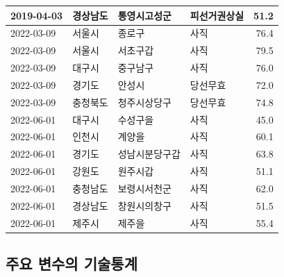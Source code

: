 \documentclass[
  11pt,
  letter]{article}
\begin{document}
\begin{longtable}[t]{l|l|l|l|r}
\hline
2019-04-03 & 경상남도 & 통영시고성군 & 피선거권상실 & 51.2\\
\hline
2022-03-09 & 서울시 & 종로구 & 사직 & 76.4\\
\hline
2022-03-09 & 서울시 & 서초구갑 & 사직 & 79.5\\
\hline
2022-03-09 & 대구시 & 중구남구 & 사직 & 76.0\\
\hline
2022-03-09 & 경기도 & 안성시 & 당선무효 & 72.0\\
\hline
2022-03-09 & 충청북도 & 청주시상당구 & 당선무효 & 74.8\\
\hline
2022-06-01 & 대구시 & 수성구을 & 사직 & 45.0\\
\hline
2022-06-01 & 인천시 & 계양을 & 사직 & 60.1\\
\hline
2022-06-01 & 경기도 & 성남시분당구갑 & 사직 & 63.8\\
\hline
2022-06-01 & 강원도 & 원주시갑 & 사직 & 51.1\\
\hline
2022-06-01 & 충청남도 & 보령시서천군 & 사직 & 62.0\\
\hline
2022-06-01 & 경상남도 & 창원시의창구 & 사직 & 51.5\\
\hline
2022-06-01 & 제주시 & 제주을 & 사직 & 55.4\\
\hline
\end{longtable}

\newpage

\hypertarget{uxc8fcuxc694-uxbcc0uxc218uxc758-uxae30uxc220uxd1b5uxacc4}{%
\subsection{주요 변수의
기술통계}\label{uxc8fcuxc694-uxbcc0uxc218uxc758-uxae30uxc220uxd1b5uxacc4}}
\end{document}
